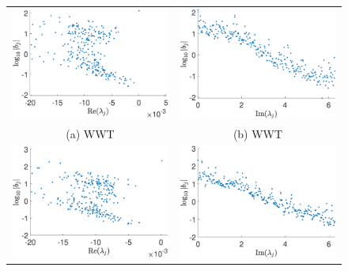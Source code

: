 \documentclass[aps,prl,preprint,groupedaddress]{revtex4-1}
\begin{document}
\begin{figure}[!ht]
\centering
\begin{tabular}{cc}
\includegraphics[width=.525\textwidth]{bvals_vs_real_lam_wwtforce_K_256_Lx_128_tf_1_pt5e4} &\hspace{-25pt} \includegraphics[width=.525\textwidth]{bvals_vs_imag_lam_wwtforce_K_256_Lx_128_tf_1_pt5e4}\\
(a) WWT & (b) WWT\\
\includegraphics[width=.525\textwidth]{bvals_vs_real_lam_lfforce_K_256_Lx_128_tf_1_pt5e4} &\hspace{-25pt} \includegraphics[width=.525\textwidth]{bvals_vs_imag_lam_lfforce_K_256_Lx_128_tf_1_pt5e4}\\

\end{tabular}
\end{figure}
\end{document}
